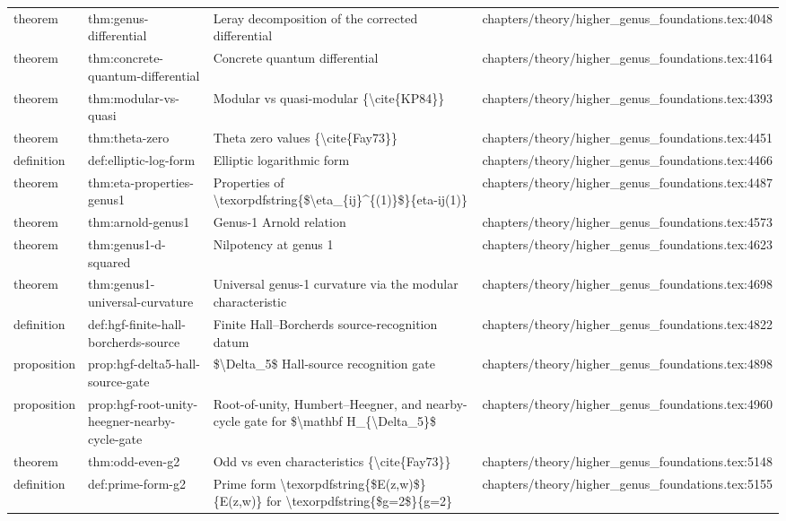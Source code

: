 \documentclass[11pt]{article}
\begin{document}
\begin{longtable}{L{0.10\textwidth}L{0.26\textwidth}L{0.42\textwidth}L{0.22\textwidth}}
theorem & thm:genus-differential & Leray decomposition of the corrected differential & chapters/theory/higher\_genus\_foundations.tex:4048\\
theorem & thm:concrete-quantum-differential & Concrete quantum differential & chapters/theory/higher\_genus\_foundations.tex:4164\\
theorem & thm:modular-vs-quasi & Modular vs quasi-modular \{\textbackslash{}cite\{KP84\}\} & chapters/theory/higher\_genus\_foundations.tex:4393\\
theorem & thm:theta-zero & Theta zero values \{\textbackslash{}cite\{Fay73\}\} & chapters/theory/higher\_genus\_foundations.tex:4451\\
definition & def:elliptic-log-form & Elliptic logarithmic form & chapters/theory/higher\_genus\_foundations.tex:4466\\
theorem & thm:eta-properties-genus1 & Properties of \textbackslash{}texorpdfstring\{\$\textbackslash{}eta\_\{ij\}\textasciicircum{}\{(1)\}\$\}\{eta-ij(1)\} & chapters/theory/higher\_genus\_foundations.tex:4487\\
theorem & thm:arnold-genus1 & Genus-1 Arnold relation & chapters/theory/higher\_genus\_foundations.tex:4573\\
theorem & thm:genus1-d-squared & Nilpotency at genus 1 & chapters/theory/higher\_genus\_foundations.tex:4623\\
theorem & thm:genus1-universal-curvature & Universal genus-1 curvature via the modular characteristic & chapters/theory/higher\_genus\_foundations.tex:4698\\
definition & def:hgf-finite-hall-borcherds-source & Finite Hall--Borcherds source-recognition datum & chapters/theory/higher\_genus\_foundations.tex:4822\\
proposition & prop:hgf-delta5-hall-source-gate & \$\textbackslash{}Delta\_5\$ Hall-source recognition gate & chapters/theory/higher\_genus\_foundations.tex:4898\\
proposition & prop:hgf-root-unity-heegner-nearby-cycle-gate & Root-of-unity, Humbert--Heegner, and nearby-cycle gate for \$\textbackslash{}mathbf H\_\{\textbackslash{}Delta\_5\}\$ & chapters/theory/higher\_genus\_foundations.tex:4960\\
theorem & thm:odd-even-g2 & Odd vs even characteristics \{\textbackslash{}cite\{Fay73\}\} & chapters/theory/higher\_genus\_foundations.tex:5148\\
definition & def:prime-form-g2 & Prime form \textbackslash{}texorpdfstring\{\$E(z,w)\$\}\{E(z,w)\} for \textbackslash{}texorpdfstring\{\$g=2\$\}\{g=2\} & chapters/theory/higher\_genus\_foundations.tex:5155\\

\end{longtable}
\end{document}
